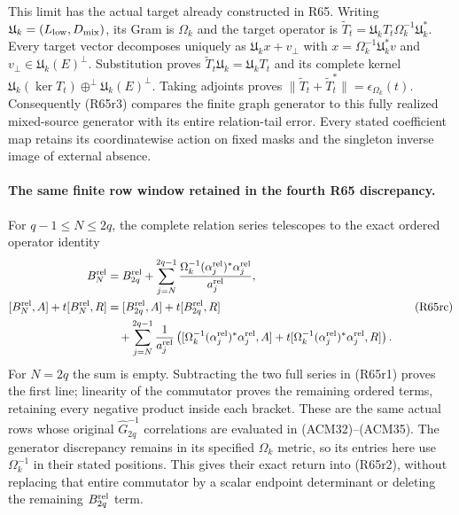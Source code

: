 This limit has the actual target already constructed in R65.
Writing $\mathfrak U_k=(L_{\rm low},D_{\rm mix})$, its
Gram is $\Omega_k$ and the target operator is
$\widetilde T_t=\mathfrak U_kT_t\Omega_k^{-1}\mathfrak U_k^*$.
Every target vector decomposes uniquely as
$\mathfrak U_kx+v_\perp$ with
$x=\Omega_k^{-1}\mathfrak U_k^*v$ and
$v_\perp\in\mathfrak U_k(E)^\perp$. Substitution proves
$\widetilde T_t\mathfrak U_k=\mathfrak U_kT_t$ and its complete
kernel $\mathfrak U_k(\ker T_t)\mathbin{\oplus^\perp}
\mathfrak U_k(E)^\perp$. Taking adjoints proves
$\|\widetilde T_t+\widetilde T_t^*\|=\epsilon_{\Omega_k}(t)$.
Consequently (R65r3) compares the finite graph generator to
this fully realized mixed-source generator with its entire
relation-tail error. Every stated coefficient map retains its
coordinatewise action on fixed masks and the singleton inverse
image of external absence.


\paragraph{The same finite row window retained in the fourth R65 discrepancy.}
For $q-1\leq N\leq2q$, the complete relation series telescopes to
the exact ordered operator identity
\[
\begin{aligned}
 B_N^{\rm rel}
 &=B_{2q}^{\rm rel}+
   \sum_{j=N}^{2q-1}\frac{\Omega_k^{-1}
             (\alpha_j^{\rm rel})^*\alpha_j^{\rm rel}}{a_j^{\rm rel}},\\
 [B_N^{\rm rel},A]+t[B_N^{\rm rel},R]
 &=[B_{2q}^{\rm rel},A]+t[B_{2q}^{\rm rel},R]\\
 &\quad+\sum_{j=N}^{2q-1}\frac1{a_j^{\rm rel}}
 \left([\Omega_k^{-1}(\alpha_j^{\rm rel})^*\alpha_j^{\rm rel},A]
       +t[\Omega_k^{-1}(\alpha_j^{\rm rel})^*\alpha_j^{\rm rel},R]
                                                        \right).
\end{aligned}\tag{R65rc}
\]
For $N=2q$ the sum is empty. Subtracting the two full series
in (R65r1) proves the first line; linearity of the commutator
proves the remaining ordered terms, retaining every negative
product inside each bracket. These are the same actual rows
whose original $\widehat G_{2q}^{-1}$ correlations are evaluated
in (ACM32)--(ACM35). The generator discrepancy remains in its
specified $\Omega_k$ metric, so its entries here use
$\Omega_k^{-1}$ in their stated positions. This gives their exact
return into (R65r2), without replacing that entire commutator
by a scalar endpoint determinant or deleting the remaining
$B_{2q}^{\rm rel}$ term.


